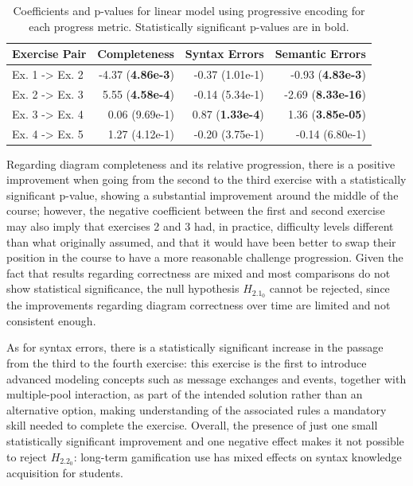 \begin{table}[ht]
    \footnotesize
    \centering
    \caption{Coefficients and p-values for linear model using progressive encoding for each progress metric. Statistically significant p-values are in bold.}
    \begin{tabular}{lrrr}
    \toprule
    Exercise Pair & Completeness & Syntax Errors & Semantic Errors  \\
    \midrule
    Ex. 1 -> Ex. 2 & -4.37 (\textbf{4.86e-3}) & -0.37 (1.01e-1) & -0.93 (\textbf{4.83e-3}) \\
    Ex. 2 -> Ex. 3 & 5.55 (\textbf{4.58e-4}) & -0.14 (5.34e-1) & -2.69 (\textbf{8.33e-16}) \\
    Ex. 3 -> Ex. 4 & 0.06 (9.69e-1) & 0.87 (\textbf{1.33e-4}) & 1.36 (\textbf{3.85e-05}) \\
    Ex. 4 -> Ex. 5 & 1.27 (4.12e-1) & -0.20 (3.75e-1) & -0.14 (6.80e-1) \\
    \bottomrule
    \end{tabular}
    \label{tab:rq2_5_prog}
\end{table}

Regarding diagram completeness and its relative progression, there is a positive improvement when going from the second to the third exercise with a statistically significant p-value, showing a substantial improvement around the middle of the course; however, the negative coefficient between the first and second exercise may also imply that exercises 2 and 3 had, in practice, difficulty levels different than what originally assumed, and that it would have been better to swap their position in the course to have a more reasonable challenge progression. Given the fact that results regarding correctness are mixed and most comparisons do not show statistical significance, the null hypothesis ${H_{2.1_{0}}}$ cannot be rejected, since the improvements regarding diagram correctness over time are limited and not consistent enough.

As for syntax errors, there is a statistically significant increase in the passage from the third to the fourth exercise: this exercise is the first to introduce advanced modeling concepts such as message exchanges and events, together with multiple-pool interaction, as part of the intended solution rather than an alternative option, making understanding of the associated rules a mandatory skill needed to complete the exercise. Overall, the presence of just one small statistically significant improvement and one negative effect makes it not possible to reject ${H_{2.2_{0}}}$: long-term gamification use has mixed effects on syntax knowledge acquisition for students.

